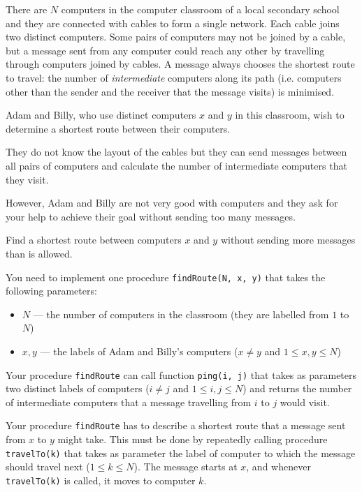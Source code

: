 \documentclass{boi2014}
\newcommand{\method}[1]{{\tt #1}}
\begin{document}
    There are $N$ computers in the computer classroom of a local
    secondary school and they are connected with cables to form
    a single network. Each cable joins two distinct computers.
    Some pairs of computers may not be joined by a
    cable, but a message sent from any computer could reach
    any other by travelling through computers joined by cables.
    A message always chooses the shortest route to travel:
    the number of \emph{intermediate} computers along its path
    (i.e. computers other than the sender and the receiver that
    the message visits) is minimised.
    
    Adam and Billy, who use distinct computers $x$ and $y$
    in this classroom, wish to determine a shortest route
    between their computers.

    They do not know the layout of the cables but they can
    send messages between all pairs of computers and calculate
    the number of intermediate computers that they visit.

    However, Adam and Billy are not very good with computers
    and they ask for your help to achieve their goal without sending
    too many messages.

    \Task
    Find a shortest route between computers $x$ and $y$ without
    sending more messages than is allowed.

    \Implementation
    You need to implement one procedure \method{findRoute(N, x, y)} that
    takes the following parameters:

    \begin{itemize}
        \item $N$ --- the number of computers in the classroom
            (they are labelled from $1$ to $N$)
        \item $x, y$ --- the labels of Adam and Billy's computers
            ($x \neq y$ and $1 \le x, y \le N$)
    \end{itemize}

    Your procedure \method{findRoute} can call function \method{ping(i, j)}
    that takes as parameters two distinct labels of computers
    ($i \neq j$ and $1 \le i, j \le N$) and returns the number of intermediate computers
    that a message travelling from $i$ to $j$ would visit.

    Your procedure \method{findRoute} has to describe a shortest route
    that a message sent from $x$ to $y$ might take. This must be done by
    repeatedly calling procedure \method{travelTo(k)} that takes as
    parameter the label of computer to which the message should travel
    next ($1 \le k \le N$). The message starts at $x$, and whenever
    \method{travelTo(k)} is called, it moves to computer $k$.
\end{document}
